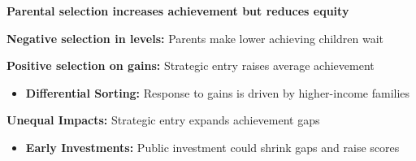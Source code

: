 \documentclass[t,aspectratio=169,11pt,presentation]{beamer}
\newenvironment{wideitemize}{\itemize\addtolength{\itemsep}{14pt}}{\enditemize}
\begin{document}
\begin{frame}{\textbf{Parental selection increases achievement but reduces equity}}

            
\begin{wideitemize}
\item {\textbf{Negative selection in levels:}} Parents make lower achieving children wait 

{\tiny \color{gray}\citep{cameron1990effects,march2005academic,schanzenbach2017your,fortner2017kindergarten}}


\item<2-> {\textbf{Positive selection on gains:}} Strategic entry raises average achievement

{\tiny \color{gray} \citep{bedard2006persistence,black2011too,mccrary2011effect,cook2016birthdays,molnar2018redshirting,fortner2019forced}}

\begin{itemize}
    \item<3-> {\textbf{Differential Sorting:}} Response to gains is driven by higher-income families 
 
    {\tiny \color{gray} \citep[]{lalonde1986evaluating,brand2010benefits,einav2010optimal,walters2018demand,finkelstein2019take,ito2021selection}}
\end{itemize}



\item<4-> {\textbf{Unequal Impacts:}} Strategic entry expands achievement gaps

{\tiny \color{gray} \citep[]{graue2000redshirting,deming2008lengthening,illinois2019anact}}


\begin{itemize}
    \item<5-> {\textbf{Early Investments:}} Public investment could shrink gaps and raise scores

    {\tiny \color{gray} \citep{elder2009kindergarten,kline2016evaluating,felfe2018does,cornelissen2018benefits,shapiro2019if}}
    
\end{itemize}


\end{wideitemize}
\end{frame}
\end{document}
